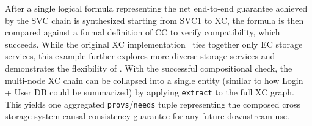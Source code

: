 After a single logical formula representing the net end-to-end guarantee
achieved by the SVC chain is synthesized starting from $\text{SVC}1$
to XC, the formula is then compared against a formal definition of CC
to verify compatibility, which succeeds. While
the original XC implementation~\cite{boltoncc} ties together only EC
storage services, this example further explores more diverse storage
services and demonstrates the flexibility of \sysname{}.
With the successful compositional check, the multi-node XC chain can be
collapsed into a single entity (similar to how Login + User DB could be summarized)
by applying \texttt{extract} to the full XC graph.
This yields one aggregated \texttt{provs}/\texttt{needs} tuple representing
the composed cross storage system causal consistency guarantee for any future downstream use.

